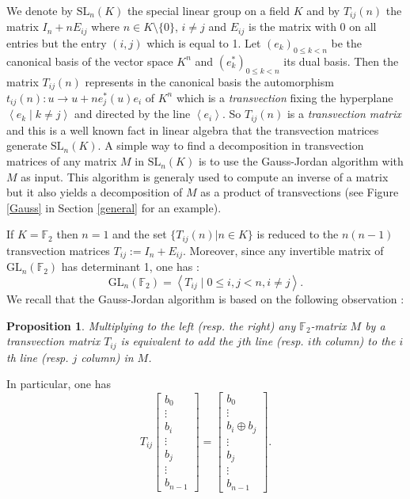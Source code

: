 \documentclass[a4paper,12pt,fleqn]{article}
\newcommand\F{\mathbb{F}}
\newcommand\GL[1][n]{\mathrm{GL}_{#1}(\mathbb{F}_2)}
\renewcommand\leq{\leqslant}
\newtheorem{prop}[theo]{Proposition}
\begin{document}
We denote by $\mathrm{SL}_n(K)$ the special linear group on a field $K$ and by $T_{ij}(n)$ the matrix $I_n+n E_{ij}$  where $n\in K\setminus\{0\}$, $i\neq j$
and $E_{ij}$ is the matrix with 0 on all entries but the entry $(i,j)$ which is equal to 1.
Let $(e_k)_{0\leq k < n}$ be the canonical basis of the vector space $K^{n}$ and $(e_k^*)_{0\leq k < n}$ its  dual basis. Then the matrix $T_{ij}(n)$
represents in the canonical basis the automorphism $t_{ij}(n): u\rightarrow u + n e_j^*(u)e_i$ of $K^{n}$ which is a \emph{transvection} fixing the hyperplane $\left<e_k\mid k\neq j\right>$ and directed by the line $\left<e_{i}\right>$. So $T_{ij}(n)$ is a \emph{transvection matrix} and this is a well known fact in linear algebra that the transvection matrices generate $\mathrm{SL}_n(K)$. A simple way to find a decomposition in transvection matrices of any matrix $M$ in $\mathrm{SL}_n(K)$ is to use the Gauss-Jordan algorithm with $M$ as input.  This algorithm is generaly used to compute an inverse of a matrix but it also yields a decomposition of $M$ as a product of transvections (see Figure \ref{Gauss} in Section \ref{general} for an example).

If $K=\F_2$ then $n=1$ and the set $\{T_{ij}(n)|n \in K \}$ is reduced to the $n(n-1)$ transvection matrices $T_{ij}:=I_n+E_{ij}$.
Moreover, since any invertible matrix of $\GL$ has determinant 1, one has :
\begin{equation}
  \GL = \left<T_{ij}\mid 0\leq i,j<n, i\neq j \right>. 
\end{equation}
We recall that the Gauss-Jordan algorithm is based on the following observation :

\begin{prop}\label{GJmult}
Multiplying to the left (resp. the right) any $\F_2$-matrix $M$ by a 
transvection matrix $T_{ij}$ is equivalent to add the $j$th line (resp. 
$i$th column) to the $i$th line (resp. $j$ column) in $M$.
\end{prop}


In particular, one has
\begin{equation}\label{tiju}
T_{ij}\begin{bmatrix}b_0\\\vdots\\b_i\\\vdots\\b_j\\\vdots\\b_{n-1}\end{bmatrix}=\begin{bmatrix}b_0\\\vdots\\b_i\oplus b_j\\\vdots\\b_j\\\vdots\\b_{n-1}\end{bmatrix}.
\end{equation}
\end{document}
